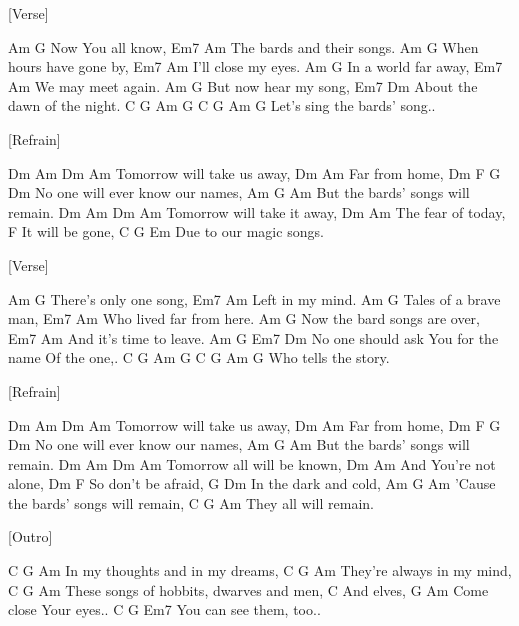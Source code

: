 [Verse]

Am          G
Now You all know,
Em7                 Am
The bards and their songs.
Am                   G
When hours have gone by,
Em7            Am
I'll close my eyes.
Am              G
In a world far away,
Em7          Am
We may meet again.
Am              G
But now hear my song,
          Em7         Dm
About the dawn of the night.
      C    G   Am     G        C  G  Am  G
Let's sing the bards' song..



[Refrain]

  Dm Am       Dm      Am
Tomorrow will take us away,
Dm       Am
Far from home,
Dm          F    G        Dm
No one will ever know our names,
    Am               G      Am
But the bards' songs will remain.
  Dm Am       Dm       Am
Tomorrow will take it away,
    Dm        Am
The fear of today,
           F
It will be gone,
    C  G         Em
Due to our magic songs.


[Verse]

Am               G
There's only one song,
Em7         Am
Left in my mind.
Am               G
Tales of a brave man,
Em7         Am
Who lived far from here.
Am                     G
Now the bard songs are over,
Em7              Am
And it's time to leave.
Am              G              Em7         Dm
No one should ask You for the name Of the one,.
     C    G   Am G   C  G   Am G
Who tells the story.


[Refrain]

  Dm Am       Dm      Am
Tomorrow will take us away,
Dm       Am
Far from home,
Dm          F    G        Dm
No one will ever know our names,
    Am               G      Am
But the bards' songs will remain.
 Dm  Am     Dm        Am
Tomorrow all will be known,
     Dm         Am
And You're not alone,
   Dm        F
So don't be afraid,
        G       Dm
In the dark and cold,
          Am             G      Am
'Cause the bards' songs will remain,
     C     G     Am
They all will remain.


[Outro]

C     G            Am
In my thoughts and in my dreams,
        C      G     Am
They're always in my mind,
      C        G        Am
These songs of hobbits, dwarves and men,
C
And elves,
     G          Am
Come close Your eyes..
        C   G     Em7
You can see them, too..
